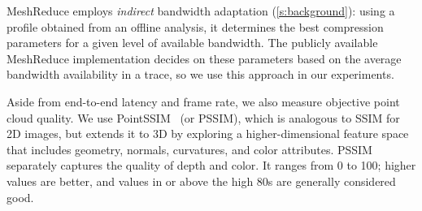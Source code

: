 MeshReduce employs \textit{indirect} bandwidth adaptation (\cref{s:background}): using a profile obtained from an offline analysis, it determines the best compression parameters for a given level of available bandwidth.
%
%
The publicly available MeshReduce implementation decides on these parameters based on the average bandwidth availability in a trace, so we use this approach in our experiments.

%

%
Aside from end-to-end latency and frame rate, we also measure objective point cloud quality.
%
We use PointSSIM~\cite{pointssim} (or PSSIM), which is analogous to SSIM for 2D images, but extends it to 3D by exploring a higher-dimensional feature space that includes geometry, normals, curvatures, and color attributes.
%
PSSIM separately captures the quality of depth and color.
%
It ranges from 0 to 100; higher values are better, and values in or above the high 80s are generally considered good.

